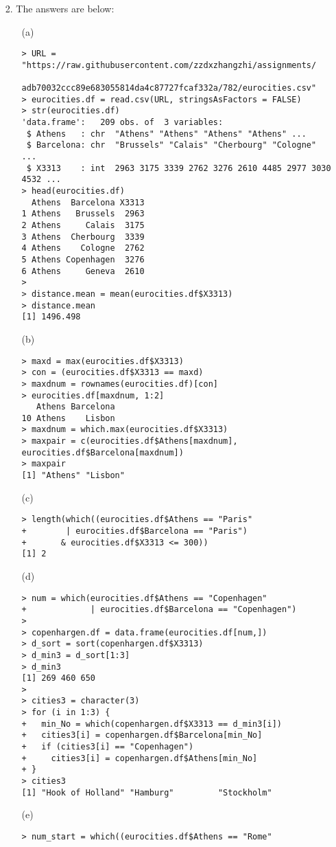 \documentclass[11pt]{report}
\theoremstyle{definition}
\theoremstyle{remark}
\begin{document}
\begin{enumerate}
    \item[2.] The answers are below:
    \begin{enumerate}
    	\item[(a)] \begin{verbatim}> URL = "https://raw.githubusercontent.com/zzdxzhangzhi/assignments/
    	adb70032ccc89e683055814da4c87727fcaf332a/782/eurocities.csv"
> eurocities.df = read.csv(URL, stringsAsFactors = FALSE)
> str(eurocities.df)
'data.frame':	209 obs. of  3 variables:
 $ Athens   : chr  "Athens" "Athens" "Athens" "Athens" ...
 $ Barcelona: chr  "Brussels" "Calais" "Cherbourg" "Cologne" ...
 $ X3313    : int  2963 3175 3339 2762 3276 2610 4485 2977 3030 4532 ...
> head(eurocities.df)
  Athens  Barcelona X3313
1 Athens   Brussels  2963
2 Athens     Calais  3175
3 Athens  Cherbourg  3339
4 Athens    Cologne  2762
5 Athens Copenhagen  3276
6 Athens     Geneva  2610
>
> distance.mean = mean(eurocities.df$X3313)
> distance.mean
[1] 1496.498\end{verbatim}
 	\item[(b)] \begin{verbatim}> maxd = max(eurocities.df$X3313)
> con = (eurocities.df$X3313 == maxd)
> maxdnum = rownames(eurocities.df)[con]
> eurocities.df[maxdnum, 1:2]
   Athens Barcelona
10 Athens    Lisbon
> maxdnum = which.max(eurocities.df$X3313)
> maxpair = c(eurocities.df$Athens[maxdnum], eurocities.df$Barcelona[maxdnum])
> maxpair
[1] "Athens" "Lisbon"\end{verbatim}
 	\item[(c)] \begin{verbatim}> length(which((eurocities.df$Athens == "Paris"
+        | eurocities.df$Barcelona == "Paris")
+       & eurocities.df$X3313 <= 300))
[1] 2\end{verbatim}
 	\item[(d)] \begin{verbatim}> num = which(eurocities.df$Athens == "Copenhagen"
+             | eurocities.df$Barcelona == "Copenhagen")
>
> copenhargen.df = data.frame(eurocities.df[num,])
> d_sort = sort(copenhargen.df$X3313)
> d_min3 = d_sort[1:3]
> d_min3
[1] 269 460 650
>
> cities3 = character(3)
> for (i in 1:3) {
+   min_No = which(copenhargen.df$X3313 == d_min3[i])
+   cities3[i] = copenhargen.df$Barcelona[min_No]
+   if (cities3[i] == "Copenhagen")
+     cities3[i] = copenhargen.df$Athens[min_No]
+ }
> cities3
[1] "Hook of Holland" "Hamburg"         "Stockholm"\end{verbatim}
 	\item[(e)] \begin{verbatim}> num_start = which((eurocities.df$Athens == "Rome"

\end{verbatim}
\end{enumerate}
\end{enumerate}
\end{document}
